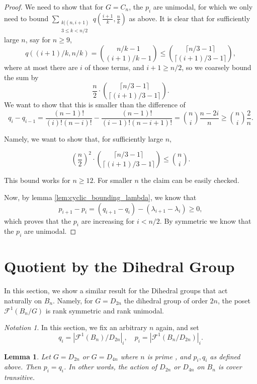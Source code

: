\documentclass{amsart}
\newtheorem{lem}[thm]{Lemma}
\theoremstyle{remark}
\newtheorem{note}[thm]{Notation}
\newcommand{\dstyle}{\displaystyle}
\begin{document}
\begin{proof}

We need to show that for $G= C_n$, the $p_i$ are unimodal, for which we only need to bound $ \dstyle \sum_{\substack{k | (n , i+1)\\ 3 \le k < n/2 }} q (\frac{i+1}{k}, \frac{n}{k}) $ as above. It is clear that for sufficiently large $n$, say for $n \ge 9$, $$q((i+1)/k, n/k) = {n/k - 1 \choose (i+1)/k -1} \le {\lceil n/3-1 \rceil \choose \lceil (i+1)/3 -1 \rceil },$$ where at most there are $i$ of those terms, and $ i+1 \ge n/2$, so we coarsely bound the sum by $$\frac{n}{2} \cdot {\lceil n/3-1 \rceil \choose \lceil (i+1)/3 -1 \rceil }. $$ We want to show that this is smaller than the difference of $$q_i - q_{i-1} = \frac{(n-1)!}{(i)! (n-i)!} - \frac{(n-1)!}{(i-1)!(n-i+1)!}= {n \choose i } \frac{n-2i}{n} \ge  {n \choose i } \frac{2}{n} .$$

Namely, we want to show that, for sufficiently large $n$, 

$$ \left(\frac{n}{2}\right)^2 \cdot {\lceil n/3-1 \rceil \choose \lceil (i+1)/3 -1 \rceil }  \le   {n \choose i}.$$

This bound works for $n \ge 12$. For smaller $n$ the claim can be easily checked. 

Now, by lemma \ref{lem:cyclic_bounding_lambda}, we know that $$p_{i+1} - p_{i} =  (q_{i+1} - q_i) - (\lambda_{i+1}- \lambda_i) \ge 0,$$  which proves that the $p_i$ are increasing for $i < n/2$. By symmetric we know that the $p_i$ are unimodal.

\end{proof}


\section{Quotient by the Dihedral Group}
\label{sec:dihedral}

In this section, we show a similar result for the Dihedral groups that act naturally on $B_n$. Namely, for $G = D_{2n}$ the dihedral group of order $2n$, the poset $\mathcal F^1(B_n/G)$ is rank symmetric and rank unimodal.


\begin{note} In this section, we fix an arbitrary $n$ again, and set $$q_i = |\mathcal F^1 (B_n)/D_{2n}|_{i}, \quad p_i = |\mathcal F^1(B_n/D_{2n})|_{i}. $$ 
\end{note}


\begin{lem}{\label{lem:dihedral_prime}}
Let $G = D_{2n}$ or $G = D_{4n}$ where $n$ is prime , and $p_i, q_i$ as defined above. Then $p_i = q_i$. In other words, the action of $D_{2n}$ or $D_{4n}$ on $B_n$ is cover transitive. 
\end{lem}
\end{document}

